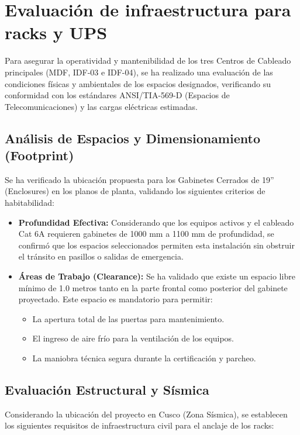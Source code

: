\section{Evaluación de infraestructura para racks y UPS}

Para asegurar la operatividad y mantenibilidad de los tres Centros de Cableado principales (MDF, IDF-03 e IDF-04), se ha realizado una evaluación de las condiciones físicas y ambientales de los espacios designados, verificando su conformidad con los estándares ANSI/TIA-569-D (Espacios de Telecomunicaciones) y las cargas eléctricas estimadas.

\subsection*{Análisis de Espacios y Dimensionamiento (Footprint)}

Se ha verificado la ubicación propuesta para los Gabinetes Cerrados de 19'' (Enclosures) en los planos de planta, validando los siguientes criterios de habitabilidad:

\begin{itemize}
    \item \textbf{Profundidad Efectiva:} Considerando que los equipos activos y el cableado Cat 6A requieren gabinetes de 1000 mm a 1100 mm de profundidad, se confirmó que los espacios seleccionados permiten esta instalación sin obstruir el tránsito en pasillos o salidas de emergencia.
    \item \textbf{Áreas de Trabajo (Clearance):} Se ha validado que existe un espacio libre mínimo de 1.0 metros tanto en la parte frontal como posterior del gabinete proyectado. Este espacio es mandatorio para permitir:
    \begin{itemize}
        \item La apertura total de las puertas para mantenimiento.
        \item El ingreso de aire frío para la ventilación de los equipos.
        \item La maniobra técnica segura durante la certificación y parcheo.
    \end{itemize}
\end{itemize}

\subsection*{Evaluación Estructural y Sísmica}

Considerando la ubicación del proyecto en Cusco (Zona Sísmica), se establecen los siguientes requisitos de infraestructura civil para el anclaje de los racks:

